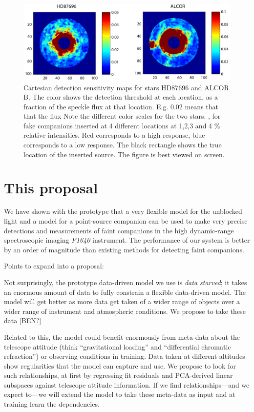 \documentclass[12pt,pdftex,preprint]{aastex}
\newcommand{\project}[1]{\textsl{#1}}
\begin{document}
\begin{figure}[h!]
\begin{center}
\includegraphics[width=6in]{figs/sens_map.pdf}
\end{center}
\vspace{-7mm}
\caption{Cartesian detection sensitivity maps for stars HD87696 and ALCOR B. The
  color shows the detection threshold at each location, as a fraction
  of the speckle flux at that location. E.g. 0.02 means that that the
  flux Note the
  different color scales for the two stars. , for fake
 companions inserted at 4 different locations at 1,2,3 and 4 \%
 relative intensities. Red corresponds to a high response, blue
 corresponds to a low response. The black rectangle shows the true location of
the inserted source. The figure is best viewed on screen. }
\label{fig:sens_map}
\end{figure}

\section{This proposal}

We have shown with the prototype that a very flexible model for the
unblocked light and a model for a point-source companion can be used
to make very precise detections and measurements of faint companions
in the high dynamic-range spectroscopic imaging \project{P1640}
instrument.  The performance of our system is better by an order of
magnitude than existing methods for detecting faint companions.

Points to expand into a proposal:

Not surprisingly, the prototype data-driven model we use is \emph{data
  starved}; it takes an enormous amount of data to fully constrain a
flexible data-driven model.  The model will get better as more data
get taken of a wider range of objects over a wider range of instrument
and atmospheric conditions.  We propose to take these data [BEN?]

Related to this, the model could benefit enormously from meta-data
about the telescope attitude (think ``gravitational loading'' and
``differential chromatic refraction'') or observing conditions in
training.  Data taken at different altitudes show regularities that
the model can capture and use.  We propose to look for such
relationships, at first by regressing fit residuals and PCA-derived
linear subspaces against telescope attitude information.  If we find
relationships---and we expect to---we will extend the model to take
these meta-data as input and at training learn the dependencies.
\end{document}
